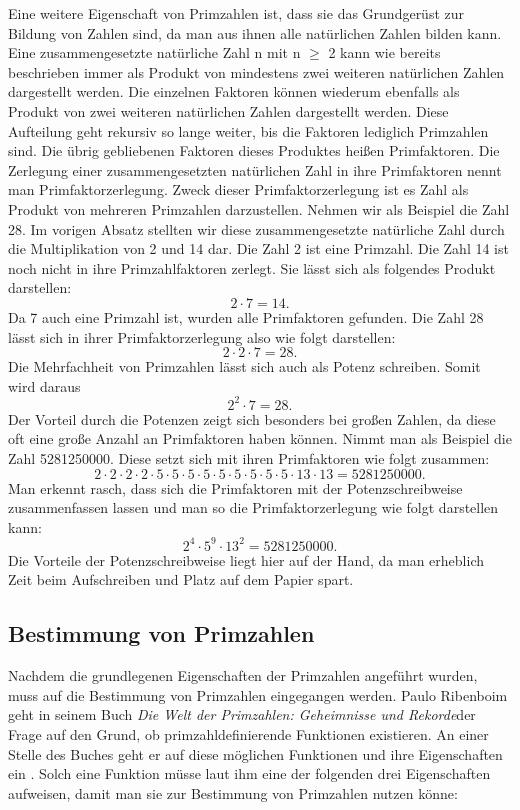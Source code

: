 Eine weitere Eigenschaft von Primzahlen ist, dass sie das Grundgerüst zur Bildung von Zahlen sind, da man aus ihnen alle natürlichen Zahlen bilden kann. Eine zusammengesetzte natürliche Zahl n mit n $\geq$ 2 kann wie bereits beschrieben immer als Produkt von mindestens zwei weiteren natürlichen Zahlen dargestellt werden. Die einzelnen Faktoren können wiederum ebenfalls als Produkt von zwei weiteren natürlichen Zahlen dargestellt werden. Diese Aufteilung geht rekursiv so lange weiter, bis die Faktoren lediglich Primzahlen sind. Die übrig gebliebenen Faktoren dieses Produktes heißen Primfaktoren. Die Zerlegung einer zusammengesetzten natürlichen Zahl in ihre Primfaktoren nennt man Primfaktorzerlegung. Zweck dieser Primfaktorzerlegung ist es Zahl als Produkt von mehreren Primzahlen darzustellen. Nehmen wir als Beispiel die Zahl 28. Im vorigen Absatz stellten wir diese zusammengesetzte natürliche Zahl durch die Multiplikation von 2 und 14 dar. Die Zahl 2 ist eine Primzahl. Die Zahl 14 ist noch nicht in ihre Primzahlfaktoren zerlegt. Sie lässt sich als folgendes Produkt darstellen: \[2 \cdot 7=14.\] Da 7 auch eine Primzahl ist, wurden alle Primfaktoren gefunden. Die Zahl 28 lässt sich in ihrer Primfaktorzerlegung also wie folgt darstellen: \[2 \cdot 2 \cdot 7=28.\] Die Mehrfachheit von Primzahlen lässt sich auch als Potenz schreiben. Somit wird daraus \[2^{2} \cdot 7=28.\] Der Vorteil durch die Potenzen zeigt sich besonders bei großen Zahlen, da diese oft eine große Anzahl an Primfaktoren haben können. Nimmt man als Beispiel die Zahl 5281250000. Diese setzt sich mit ihren Primfaktoren wie folgt zusammen: \[2 \cdot 2 \cdot 2 \cdot 2 \cdot 5 \cdot 5 \cdot 5 \cdot 5 \cdot 5 \cdot 5 \cdot 5 \cdot 5 \cdot 5 \cdot 13 \cdot 13=5281250000.\] Man erkennt rasch, dass sich die Primfaktoren mit der Potenzschreibweise zusammenfassen lassen und man so die Primfaktorzerlegung wie folgt darstellen kann: \[2^{4} \cdot 5^{9} \cdot 13^{2}=5281250000.\] Die Vorteile der Potenzschreibweise liegt hier auf der Hand, da man erheblich Zeit beim Aufschreiben und Platz auf dem Papier spart.

\subsection{Bestimmung von Primzahlen}\label{sec:bestimmung_primzahlen}
Nachdem die grundlegenen Eigenschaften der Primzahlen angeführt wurden, muss auf die Bestimmung von Primzahlen eingegangen werden. Paulo Ribenboim geht in seinem Buch \glqq\textit{Die Welt der Primzahlen: Geheimnisse und Rekorde}\grqq der Frage auf den Grund, ob primzahldefinierende Funktionen existieren. An einer Stelle des Buches geht er auf diese möglichen Funktionen und ihre Eigenschaften ein \cite[vgl.][S. 137]{Ribenboim.2011}. Solch eine Funktion müsse laut ihm eine der folgenden drei Eigenschaften aufweisen, damit man sie zur Bestimmung von Primzahlen nutzen könne:

